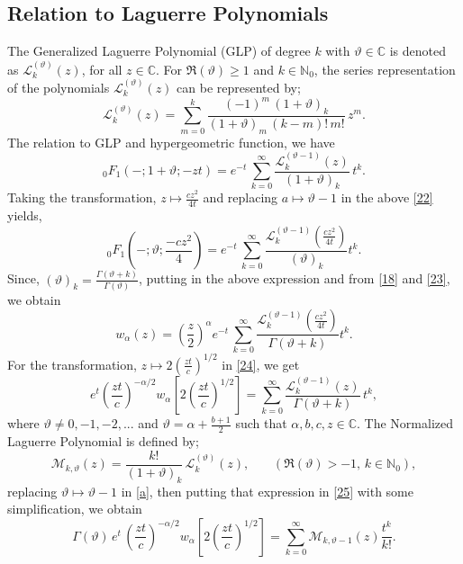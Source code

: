 \documentclass{amsart}
\theoremstyle{definition}
\theoremstyle{remark}
\numberwithin{equation}{section}
\begin{document}
\subsection{Relation to Laguerre Polynomials}
The Generalized Laguerre Polynomial (GLP) of degree $k$ with $\vartheta \in \mathbb{C}$ is denoted as $\mathcal{L}_{k} ^{(\vartheta)} (z)$, for all $z\in \mathbb{C}$.
 For $\Re(\vartheta)\geqslant1$ and $k \in \mathbb{N}_{0}$, the series representation of the polynomials  $\mathcal{L}_{k} ^{(\vartheta)} (z)$ can be represented by\cite{Erd};
 \begin{equation}\label{21}
   \mathcal{L}_{k} ^{(\vartheta)} (z) = \sum_{m=0}^{k} \frac{(-1)^{m}\, (1+\vartheta)_{k}}{(1+\vartheta)_{m}\, (k-m)!\, m!} \, z^{m}.
 \end{equation}
The relation to GLP and hypergeometric function\cite{Erd}, we have
\begin{equation}\label{22}
  _{0}F_{1} (-; 1+\vartheta; -zt) = e^{-t} \, \sum_{k=0}^{\infty} \frac{\mathcal{L}_{k} ^{(\vartheta-1)} (z)}{(1+\vartheta)_{k}}\, t^{k}.
\end{equation}
Taking the transformation, $z\mapsto \frac{cz^{2}}{4t}$ and replacing $a\mapsto \vartheta-1$ in the above \eqref{22} yields,
\begin{equation}\label{23}
  _{0}F_{1} \left(-; \vartheta;\frac{-cz^{2}}{4} \right) = e^{-t} \, \sum_{k=0}^{\infty} \frac{\mathcal{L}_{k} ^{(\vartheta-1)} \left(\frac{cz^{2}}{4t}\right)}{(\vartheta)_{k}} t^{k}.
\end{equation}
Since, $(\vartheta)_{k} = \frac{\Gamma(\vartheta+k)}{\Gamma(\vartheta)}$, putting in the above expression and from \eqref{18} and \eqref{23}, we obtain
\begin{equation}\label{24}
w_{\alpha} (z) = \left(\frac{z}{2}\right)^{\alpha} e^{-t}\,\sum_{k=0}^{\infty} \frac{\mathcal{L}_{k} ^{(\vartheta-1)} \left(\frac{cz^{2}}{4t}\right)}{\Gamma(\vartheta+k)} t^{k}.
\end{equation}
For the transformation, $z\mapsto 2\left(\frac{zt}{c}\right)^{1/2}$ in \eqref{24}, we get
\begin{equation}\label{25}
  e^{t} \left(\frac{zt}{c}\right)^{-\alpha/2} w_{\alpha} \left[2\left(\frac{zt}{c}\right)^{1/2} \right] = \sum_{k=0}^{\infty} \frac{\mathcal{L}_{k} ^{(\vartheta-1)} (z)}{\Gamma(\vartheta+k)}\, t^{k},
\end{equation}
where $\vartheta \neq0,-1,-2,...$ and $\vartheta = \alpha + \frac{b+1}{2}$ such that $\alpha,b,c,z \in \mathbb{C}$.
  The Normalized Laguerre Polynomial is defined by\cite{Praj};
\begin{equation}\label{a}
  \mathcal{M}_{k,\vartheta} (z) = \frac{k!}{(1+\vartheta)_{k}}\, \mathcal{L}_{k}^{(\vartheta)} (z),\,\,\,\,\,\,\,\,\,\,\, (\Re(\vartheta)>-1,\, k\in \mathbb{N}_{0}),
\end{equation}
replacing $\vartheta \mapsto \vartheta-1$ in \eqref{a}, then putting that expression in \eqref{25} with some simplification, we obtain
\begin{equation}\label{b}
  \Gamma(\vartheta)\, e^{t}\, \left(\frac{zt}{c}\right)^{-\alpha/2} w_{\alpha} \left[2\left(\frac{zt}{c}\right)^{1/2} \right] = \sum_{k=0}^{\infty} \mathcal{M}_{k,\vartheta-1} (z) \frac{t^{k}}{k!}.
\end{equation}
\end{document}
